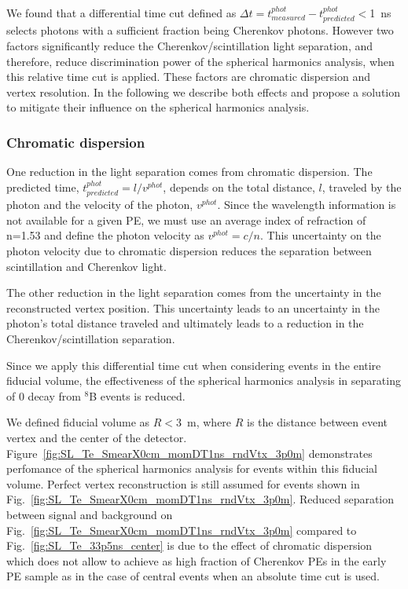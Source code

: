 We found that a differential time cut defined as $\Delta t=t^{phot}_{measured} - t^{phot}_{predicted}<$1~ns selects photons with a 
sufficient fraction being Cherenkov photons. However two factors significantly reduce the Cherenkov/scintillation light 
separation, and therefore, reduce discrimination power of the spherical harmonics analysis, when this relative time cut is applied. 
These factors are chromatic dispersion and vertex resolution. In the following we describe both effects and propose a solution to 
mitigate their influence on the spherical harmonics analysis.

\subsubsection{Chromatic dispersion}
One reduction in the light separation comes from chromatic dispersion. The predicted time, $ t^{phot}_{predicted}=l/v^{phot}$, depends 
on the total distance, $l$, traveled by the photon and the velocity of the photon, $v^{phot}$.  Since the wavelength information is 
not available for a given PE, we must use an average index of refraction of n=1.53 and define the photon velocity as $v^{phot} = c/n$. 
This uncertainty on the photon velocity due to chromatic dispersion reduces the separation between scintillation and Cherenkov light. 

The other reduction in the light separation comes from the uncertainty in the reconstructed vertex position. This uncertainty leads to 
an uncertainty in the photon's total distance traveled and ultimately leads to a reduction in the Cherenkov/scintillation separation.

Since we apply this differential time cut when considering events in the entire fiducial volume, the effectiveness of the spherical 
harmonics analysis in separating of 0{\nbb} decay from $^{8}$B events is reduced. 

We defined fiducial volume as $R<3$~m, where $R$ is the distance between event vertex and the center of the detector.
Figure~\ref{fig:SL_Te_SmearX0cm_momDT1ns_rndVtx_3p0m} demonstrates perfomance of the spherical harmonics analysis for events within this
fiducial volume. Perfect vertex reconstruction is still assumed for events shown in Fig.~\ref{fig:SL_Te_SmearX0cm_momDT1ns_rndVtx_3p0m}. 
Reduced separation between signal and background on Fig.~\ref{fig:SL_Te_SmearX0cm_momDT1ns_rndVtx_3p0m} compared to 
Fig.~\ref{fig:SL_Te_33p5ns_center} is due to the effect of chromatic dispersion which does not allow to achieve as high fraction of 
Cherenkov PEs in the early PE sample as in the case of central events when an absolute time cut is used.



